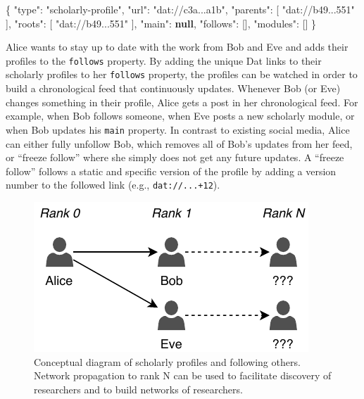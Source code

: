 \documentclass[publications,article,submit,moreauthors,pdftex,10pt,a4paper]{Definitions/mdpi}
\newenvironment{Shaded}{\begin{snugshade}}{\end{snugshade}}
\newcommand{\DataTypeTok}[1]{\textcolor[rgb]{0.13,0.29,0.53}{#1}}
\newcommand{\FunctionTok}[1]{\textcolor[rgb]{0.00,0.00,0.00}{#1}}
\newcommand{\KeywordTok}[1]{\textcolor[rgb]{0.13,0.29,0.53}{\textbf{#1}}}
\newcommand{\OtherTok}[1]{\textcolor[rgb]{0.56,0.35,0.01}{#1}}
\newcommand{\StringTok}[1]{\textcolor[rgb]{0.31,0.60,0.02}{#1}}
\begin{document}
\begin{Shaded}
\begin{Highlighting}[]
\FunctionTok{\{}
  \DataTypeTok{"type"}\FunctionTok{:} \StringTok{"scholarly-profile"}\FunctionTok{,}
  \DataTypeTok{"url"}\FunctionTok{:} \StringTok{"dat://c3a...a1b"}\FunctionTok{,}
  \DataTypeTok{"parents"}\FunctionTok{:} \OtherTok{[} \StringTok{"dat://b49...551"} \OtherTok{]}\FunctionTok{,}
  \DataTypeTok{"roots"}\FunctionTok{:} \OtherTok{[} \StringTok{"dat://b49...551"} \OtherTok{]}\FunctionTok{,}
  \DataTypeTok{"main"}\FunctionTok{:} \KeywordTok{null}\FunctionTok{,}
  \DataTypeTok{"follows"}\FunctionTok{:} \OtherTok{[]}\FunctionTok{,}
  \DataTypeTok{"modules"}\FunctionTok{:} \OtherTok{[]}
\FunctionTok{\}}
\end{Highlighting}
\end{Shaded}

Alice wants to stay up to date with the work from Bob and Eve and adds
their profiles to the \texttt{follows} property. By adding the unique
Dat links to their scholarly profiles to her \texttt{follows} property,
the profiles can be watched in order to build a chronological feed that
continuously updates. Whenever Bob (or Eve) changes something in their
profile, Alice gets a post in her chronological feed. For example, when
Bob follows someone, when Eve posts a new scholarly module, or when Bob
updates his \texttt{main} property. In contrast to existing social
media, Alice can either fully unfollow Bob, which removes all of Bob's
updates from her feed, or ``freeze follow'' where she simply does not
get any future updates. A ``freeze follow'' follows a static and
specific version of the profile by adding a version number to the
followed link (e.g., \texttt{dat://...+12}).

\begin{figure}

{\centering \includegraphics[width=1\linewidth]{fig3} 

}

\caption{Conceptual diagram of scholarly profiles and following others. Network propagation to rank N can be used to facilitate discovery of researchers and to build networks of researchers.}\label{fig:datcom-fig3}
\end{figure}
\end{document}
